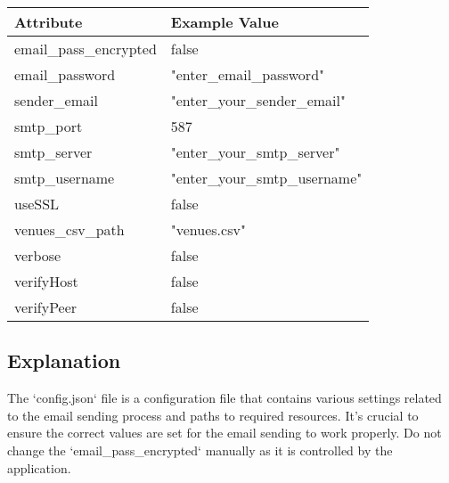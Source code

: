 \documentclass{article}
\begin{document}
	\begin{tabular}{|l|l|}
		\hline
		\textbf{Attribute} & \textbf{Example Value} \\
		\hline
		email\_pass\_encrypted & false \\
		\hline
		email\_password & "enter\_email\_password" \\
		\hline
		sender\_email & "enter\_your\_sender\_email" \\
		\hline
		smtp\_port & 587 \\
		\hline
		smtp\_server & "enter\_your\_smtp\_server" \\
		\hline
		smtp\_username & "enter\_your\_smtp\_username" \\
		\hline
		useSSL & false \\
		\hline
		venues\_csv\_path & "venues.csv" \\
		\hline
		verbose & false \\
		\hline
		verifyHost & false \\
		\hline
		verifyPeer & false \\
		\hline
	\end{tabular}
	
	\subsection*{Explanation}
	The `config.json` file is a configuration file that contains various settings related to the email sending process and paths to required resources. It's crucial to ensure the correct values are set for the email sending to work properly. Do not change the `email\_pass\_encrypted` manually as it is controlled by the application.
	
\end{document}

